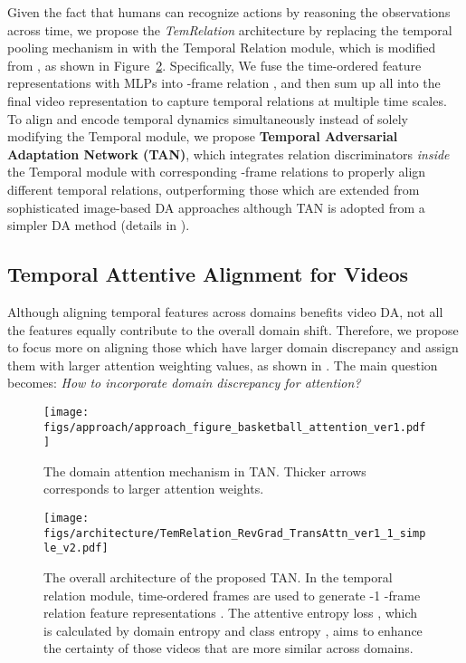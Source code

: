 \documentclass[10pt,twocolumn,letterpaper]{article}
\begin{document}
Given the fact that humans can recognize actions by reasoning the observations across time, we propose the \textit{TemRelation} architecture by replacing the temporal pooling mechanism in  with the Temporal Relation module, which is modified from \cite{zhou2018temporalrelation}, as shown in Figure~\ref{fig:TemRelation_RevGrad_TransAttn}. 
Specifically, We fuse the time-ordered feature representations with MLPs into -frame relation , and then sum up all  into the final video representation to capture temporal relations at multiple time scales. 
To align and encode temporal dynamics simultaneously instead of solely modifying the Temporal module, we propose \textbf{Temporal Adversarial Adaptation Network (TAN)},
which integrates relation discriminators  \textit{inside} the Temporal module with corresponding -frame relations to properly align different temporal relations,  
outperforming those which are extended from sophisticated image-based DA approaches although TAN is adopted from a simpler DA method (details in ).

\subsection{Temporal Attentive Alignment for Videos} \label{sec:TAAAN}
Although aligning temporal features across domains benefits video DA, not all the features equally contribute to the overall domain shift. 
Therefore, we propose to focus more on aligning those which have larger domain discrepancy and assign them with 
larger attention weighting values, as shown in .
The main question becomes: \textit{How to incorporate domain discrepancy for attention?} 

\begin{figure}[!t]
\centering
\texttt{[image: figs/approach/approach\_figure\_basketball\_attention\_ver1.pdf]}
\caption{The domain attention mechanism in TAN.
Thicker arrows corresponds to larger attention weights.
}
\label{fig:overview_domain_attention}
\end{figure}

\begin{figure}[!t]
\centering
\texttt{[image: figs/architecture/TemRelation\_RevGrad\_TransAttn\_ver1\_1\_simple\_v2.pdf]}
\caption{The overall architecture of the proposed TAN. In the temporal relation module, time-ordered frames are used to generate -1 -frame relation feature representations .
The attentive entropy loss , which is calculated by domain entropy  and class entropy , aims to enhance the certainty of those videos that are more similar across domains. 
}
\label{fig:TemRelation_RevGrad_TransAttn}
\end{figure}
\end{document}
